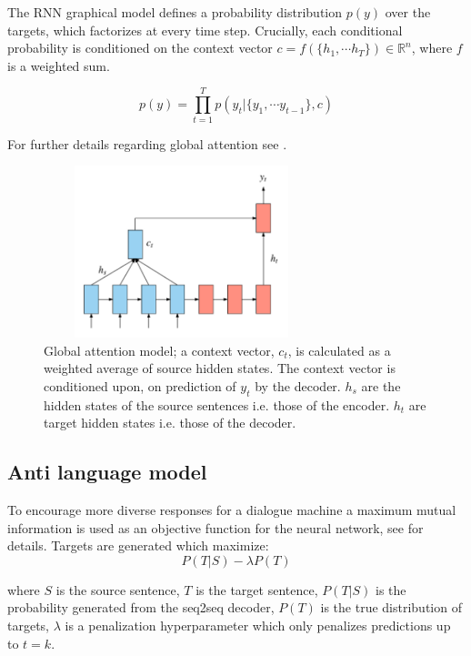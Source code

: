 \documentclass[%
 reprint,
 amsmath,amssymb,
 aps,
]{revtex4-1}
\begin{document}
The RNN graphical model defines a probability distribution $p(y)$ over the targets, which factorizes at every time step. Crucially, each conditional probability is conditioned on the context vector $c = f(\{h_1, \cdots h_{T}\}) \in \mathbb{R}^{n}$, where $f$ is a weighted sum.

\begin{equation}
p(y) = \prod_{t=1}^{T}p(y_t | \{y_1, \cdots y_{t-1} \}, c)
\end{equation}

For further details regarding global attention see \cite{globalattention}.

\begin{figure}
  \includegraphics[width=8cm, height=5cm, keepaspectratio]{NLU_attention.png}
  \caption{Global attention model; a context vector, $c_t$, is calculated as a weighted average of source hidden states. The context vector is conditioned upon, on prediction of $y_t$ by the decoder. $h_s$ are the hidden states of the source sentences i.e. those of the encoder. $h_t$ are target hidden states i.e. those of the decoder.}
\end{figure}

\subsection{\label{sec:level2}Anti language model} \label{antilmtb}
To encourage more diverse responses for a dialogue machine a maximum mutual information is used as an objective function for the neural network, see \cite{antilm} for details. Targets are generated which maximize: 
\begin{equation} \label{antilmeqn}
P(T|S) - \lambda P(T)
\end{equation}

where $S$ is the source sentence, $T$ is the target sentence, $P(T|S)$ is the probability generated from the seq2seq decoder, $P(T)$ is the true distribution of targets, $\lambda$ is a penalization hyperparameter which only penalizes predictions up to $t=k$. 
\end{document}
